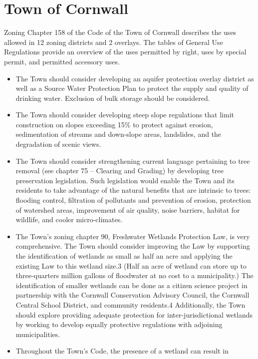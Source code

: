 \section{Town of Cornwall}
Zoning Chapter 158 of the Code of the Town of Cornwall describes the uses 
allowed in 12 zoning districts and 2 overlays. The tables of General Use 
Regulations provide an overview of the uses permitted by right, uses by special 
permit, and permitted accessory uses.
\begin{itemize}
    \item The Town should consider developing an aquifer protection overlay 
    district as well as a Source Water Protection Plan to protect the supply 
    and quality of drinking water.  Exclusion of bulk storage should be 
    considered.
    \item The Town should consider developing steep slope regulations that limit 
    construction on slopes exceeding 15\% to protect against erosion, 
    sedimentation of streams and down-slope areas, landslides, and the 
    degradation of scenic views.
    \item The Town should consider strengthening current language pertaining 
    to tree removal (see chapter 75 – Clearing and Grading) by developing tree 
    preservation legislation. Such legislation would enable the Town and its 
    residents to take advantage of the natural benefits that are intrinsic to 
    trees: 
    flooding control, filtration of pollutants and prevention of erosion, 
    protection of watershed areas, improvement of air quality, noise barriers, 
    habitat for wildlife, and cooler micro-climates.
    \item The Town’s zoning chapter 90, Freshwater Wetlands Protection Law, is 
    very comprehensive. The Town should consider improving the Law by supporting 
    the identification of wetlands as small as half an acre and applying the 
    existing Law to this wetland size.3 (Half an acre of wetland can store up 
    to three-quarters million gallons of floodwater at no cost to a 
    municipality.) The identification of smaller wetlands can be done as a 
    citizen science project in partnership with the Cornwall Conservation 
    Advisory Council, the Cornwall Central School District, and community 
    residents.4 Additionally, the Town should explore providing adequate 
    protection for inter-jurisdictional wetlands by working to develop equally 
    protective regulations with adjoining municipalities.
    \item Throughout the Town’s Code, the presence of a wetland can result in 

\end{itemize}
